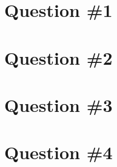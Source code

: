\documentclass[11pt]{article}
\author{\me}
\title{\assignment}
\begin{document}
\setlength{\parskip}{.1 in}

\maketitle
\newpage

\section*{Question \#1}
 \newpage

\section*{Question \#2}
 \newpage

\section*{Question \#3}
 \newpage

\section*{Question \#4}
 \newpage
\end{document}
